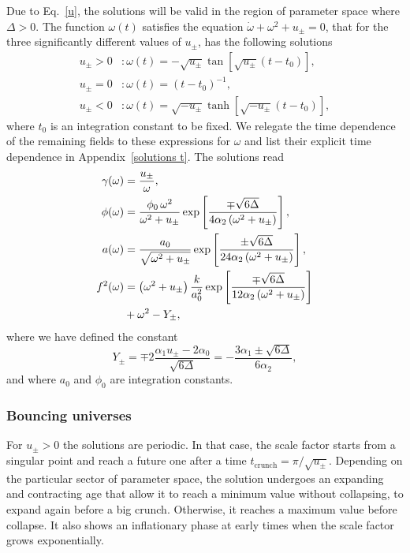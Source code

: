 \documentclass[aps,prd,12pt,superscriptaddress,showpacs,showkeys,longbibliography,reprint]{revtex4-1}
\begin{document}
Due to Eq.~\eqref{u}, the solutions will be valid in the region of parameter space where $\Delta>0$. The function $\omega(t)$ satisfies the equation $\dot{\omega}+\omega^2+u_{\pm}=0$, that for the three significantly different values of $u_\pm$, has the following solutions
\begin{align}
  u_\pm>0&:\omega(t)=-\sqrt{u_\pm}\tan\left[\sqrt{u_\pm}\left(t-t_0\right)\right],\\
  u_\pm=0&:\omega(t)=\left(t-t_0\right)^{-1},\\
  u_\pm<0&:\omega(t)=\sqrt{-u_\pm}\tanh\left[\sqrt{-u_\pm}\left(t-t_0\right)\right],
\end{align}
where $t_0$ is an integration constant to be fixed. We relegate the time dependence of the remaining fields to these expressions for $\omega$ and list their explicit time dependence in Appendix~\ref{solutions t}. The solutions read
\begin{align}
  \gamma(\omega)&=\frac{u_\pm}{\omega},\\
  \phi(\omega)&=\frac{\phi_0\,\omega^2}{\omega^2+u_\pm}\exp\left[\frac{\mp\sqrt{6\Delta}}{4\alpha_2\left(\omega^2+u_\pm\right)}\right],\\
  a(\omega)&=\frac{a_0}{\sqrt{\omega^2+u_\pm}}\exp\left[\frac{\pm\sqrt{6\Delta}} {24\alpha_2\left(\omega^2+u_\pm\right)}\right],\\
  f^2(\omega)&=\left(\omega^2+u_\pm\right)\frac{k}{a_0^2}\exp\left[\frac{\mp\sqrt{6\Delta}}{12\alpha_2\left(\omega^2+u_\pm\right)}\right]\notag\\
  &+\omega^2-Y_\pm,
\end{align}
where we have defined the constant
\begin{equation*}
  Y_{\pm}=\mp2\frac{\alpha_1 u_\pm-2\alpha_0}{\sqrt{6\Delta}}=-\frac{3\alpha_1\pm\sqrt{6\Delta}}{6\alpha_2},
\end{equation*}
and where $a_0$ and $\phi_0$ are integration constants.

\subsubsection{Bouncing universes}
For $u_\pm>0$ the solutions are periodic. In that case, the scale factor starts from a singular point and reach a future one after a time $t_{\text{crunch}}=\pi/\sqrt{u_\pm}$. Depending on the particular sector of parameter space, the solution undergoes an expanding and contracting age that allow it to reach a minimum value without collapsing, to expand again before a big crunch. Otherwise, it reaches a maximum value before collapse. It also shows an inflationary phase at early times when the scale factor grows exponentially.
\end{document}
